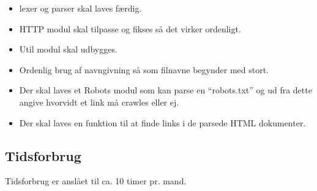 \documentclass[a4paper,10pt,draft]{article}
\begin{document}
\begin{itemize}
\item lexer og parser skal laves færdig.
\item HTTP modul skal tilpasse og fikses så det virker ordenligt.
\item Util modul skal udbygges.
\item Ordenlig brug af navngivning så som filnavne begynder med stort.
\item Der skal laves et Robots modul som kan parse en ``robots.txt'' og ud fra dette angive hvorvidt et link må crawles eller ej.
\item Der skal laves en funktion til at finde links i de parsede HTML dokumenter.
\end{itemize}

\subsection{Tidsforbrug}

Tidsforbrug er anslået til ca. 10 timer pr. mand.
\end{document}
